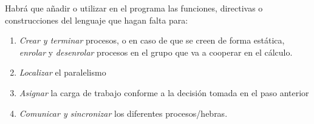 \documentclass[10pt,a4paper,spanish]{report}
\begin{document}
Habrá que añadir o utilizar en el programa las funciones, directivas o construcciones del lenguaje que hagan falta para:
\begin{enumerate}[\color{azul}{\bf $\heartsuit$}]
    \item \textcolor[rgb]{0.2,0.4,0.8}{\textit{Crear y terminar}} procesos, o en caso de que se creen de forma estática, \textcolor[rgb]{0.2,0.4,0.8}{\textit{enrolar}} y \textcolor[rgb]{0.2,0.4,0.8}{\textit{desenrolar}} procesos en el grupo que va a cooperar en el cálculo.
    \item \textcolor[rgb]{0.2,0.4,0.8}{\textit{Localizar}} el paralelismo
    \item \textcolor[rgb]{0.2,0.4,0.8}{\textit{Asignar}} la carga de trabajo conforme a la decisión tomada en el paso anterior
    \item \textcolor[rgb]{0.2,0.4,0.8}{\textit{\textcolor[rgb]{0.2,0.4,0.8}{Comunicar y sincronizar}}} los diferentes procesos/hebras.
\end{enumerate}


\end{document}
